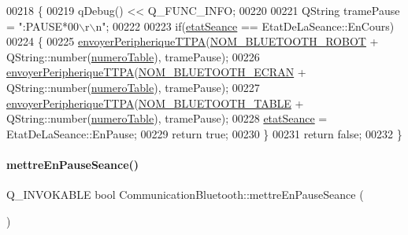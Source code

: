 \begin{DoxyCode}
00218 \{
00219     qDebug() << Q\_FUNC\_INFO;
00220 
00221     QString tramePause = \textcolor{stringliteral}{":PAUSE*00\(\backslash\)r\(\backslash\)n"};
00222 
00223     \textcolor{keywordflow}{if}(\hyperlink{class_communication_bluetooth_adc66f3034d46f3964a26b62ad98e784f}{etatSeance} == EtatDeLaSeance::EnCours)
00224     \{
00225         \hyperlink{class_communication_bluetooth_a73d95b841bf64a4463760435a41fc219}{envoyerPeripheriqueTTPA}(\hyperlink{terminal-_t_t_p_a_2communicationbluetooth_8h_a47332bb9b30ed8b0f38fa7b5bd11fd47}{NOM\_BLUETOOTH\_ROBOT} + 
      QString::number(\hyperlink{class_communication_bluetooth_a9428f8261f0cc055e9c6fed9a61cb595}{numeroTable}), tramePause);
00226         \hyperlink{class_communication_bluetooth_a73d95b841bf64a4463760435a41fc219}{envoyerPeripheriqueTTPA}(\hyperlink{terminal-_t_t_p_a_2communicationbluetooth_8h_a2bd8beaaf0c4b59979a3f78d4c134ec8}{NOM\_BLUETOOTH\_ECRAN} + 
      QString::number(\hyperlink{class_communication_bluetooth_a9428f8261f0cc055e9c6fed9a61cb595}{numeroTable}), tramePause);
00227         \hyperlink{class_communication_bluetooth_a73d95b841bf64a4463760435a41fc219}{envoyerPeripheriqueTTPA}(\hyperlink{terminal-_t_t_p_a_2communicationbluetooth_8h_aa416b2be7573de0d7832248a27ba09a8}{NOM\_BLUETOOTH\_TABLE} + 
      QString::number(\hyperlink{class_communication_bluetooth_a9428f8261f0cc055e9c6fed9a61cb595}{numeroTable}), tramePause);
00228         \hyperlink{class_communication_bluetooth_adc66f3034d46f3964a26b62ad98e784f}{etatSeance} = EtatDeLaSeance::EnPause;
00229         \textcolor{keywordflow}{return} \textcolor{keyword}{true};
00230     \}
00231     \textcolor{keywordflow}{return} \textcolor{keyword}{false};
00232 \}
\end{DoxyCode}
\mbox{\label{class_communication_bluetooth_ac611820990eee132f457497dd26b63fe}} 
\paragraph{\texorpdfstring{mettre\+En\+Pause\+Seance()}{mettreEnPauseSeance()}\hspace{0.1cm}{\footnotesize\ttfamily [2/2]}}
{\footnotesize\ttfamily Q\+\_\+\+I\+N\+V\+O\+K\+A\+B\+LE bool Communication\+Bluetooth\+::mettre\+En\+Pause\+Seance (\begin{DoxyParamCaption}{ }\end{DoxyParamCaption})}

